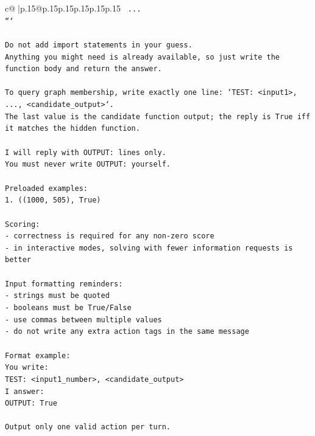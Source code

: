 \documentclass{article}
\begin{document}
{\begin{supertabular}{c@{$\;$}|p{.15\linewidth}@{}p{.15\linewidth}p{.15\linewidth}p{.15\linewidth}p{.15\linewidth}p{.15\linewidth}}
{{{\texttt{    ...} \\
\texttt{```} \\
\\ 
\texttt{Do not add import statements in your guess.} \\
\texttt{Anything you might need is already available, so just write the function body and return the answer.} \\
\\ 
\texttt{To query graph membership, write exactly one line: `TEST: <input1>, ..., <candidate\_output>`.} \\
\texttt{The last value is the candidate function output; the reply is True iff it matches the hidden function.} \\
\\ 
\texttt{I will reply with OUTPUT: lines only.} \\
\texttt{You must never write OUTPUT: yourself.} \\
\\ 
\texttt{Preloaded examples:} \\
\texttt{1. ((1000, 505), True)} \\
\\ 
\texttt{Scoring:} \\
\texttt{{-} correctness is required for any non{-}zero score} \\
\texttt{{-} in interactive modes, solving with fewer information requests is better} \\
\\ 
\texttt{Input formatting reminders:} \\
\texttt{{-} strings must be quoted} \\
\texttt{{-} booleans must be True/False} \\
\texttt{{-} use commas between multiple values} \\
\texttt{{-} do not write any extra action tags in the same message} \\
\\ 
\texttt{Format example:} \\
\texttt{You write:} \\
\texttt{TEST: <input1\_number>, <candidate\_output>} \\
\texttt{I answer:} \\
\texttt{OUTPUT: True} \\
\\ 
\texttt{Output only one valid action per turn.} \\
            }
        }
    }
     \\ \\


\end{supertabular}}
\end{document}
